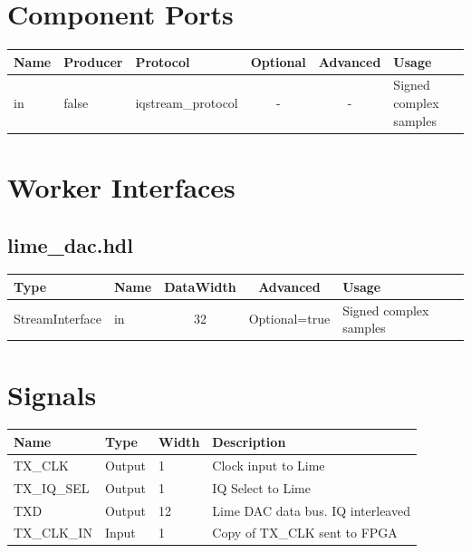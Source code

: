 \documentclass{article}
\def\comp{lime\_dac}
\begin{document}
\begin{landscape}
	\section*{Component Ports}
	\begin{scriptsize}
		\begin{tabular}{|M{2cm}|M{1.5cm}|M{4cm}|c|c|M{9cm}|}
			\hline
			Name & Producer & Protocol           & Optional & Advanced & Usage                  \\
			\hline
			in   & false    & iqstream\_protocol & -        & -        & Signed complex samples \\
			\hline
		\end{tabular}
	\end{scriptsize}

	\section*{Worker Interfaces}
	\subsection*{\comp.hdl}
	\begin{scriptsize}
		\begin{tabular}{|M{2cm}|M{1.5cm}|c|c|M{12cm}|}
			\hline
			\rowcolor{blue}
			Type            & Name & DataWidth & Advanced      & Usage                  \\
			\hline
			StreamInterface & in   & 32        & Optional=true & Signed complex samples \\
			\hline
		\end{tabular}
	\end{scriptsize}

	\section*{Signals}
	\scriptsize
	\begin{tabular}{|M{2.5cm}|M{1.5cm}|M{1.5cm}|M{14.5cm}|}
		\hline
		Name & Type & Width & Description \\
		\hline
		TX\_CLK & Output & 1 & Clock input to Lime \\
		\hline
		TX\_IQ\_SEL & Output & 1 & IQ Select to Lime \\
		\hline
		TXD & Output & 12 & Lime DAC data bus. IQ interleaved \\
		\hline
		TX\_CLK\_IN & Input & 1 & Copy of TX\_CLK sent to FPGA \\
		\hline	\end{tabular}
		\end{landscape}
\end{document}
